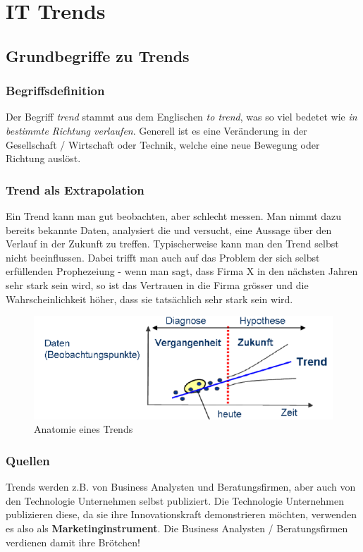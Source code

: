 \chapter{IT Trends}
\section{Grundbegriffe zu Trends}
\subsection{Begriffsdefinition}
Der Begriff \textit{trend} stammt aus dem Englischen \textit{to trend}, was so viel bedetet wie \textit{in bestimmte  Richtung verlaufen}. Generell ist es eine Veränderung in der Gesellschaft / Wirtschaft oder Technik, welche eine neue Bewegung oder Richtung auslöst.
\subsection{Trend als Extrapolation}
Ein Trend kann man gut beobachten, aber schlecht messen. Man nimmt dazu bereits bekannte Daten, analysiert die und versucht, eine Aussage über den Verlauf in der Zukunft zu treffen. Typischerweise kann man den Trend selbst nicht beeinflussen. Dabei trifft man auch auf das Problem der sich selbst erfüllenden Prophezeiung - wenn man sagt, dass Firma X in den nächsten Jahren sehr stark sein wird, so ist das Vertrauen in die Firma grösser und die Wahrscheinlichkeit höher, dass sie tatsächlich sehr stark sein wird.
\begin{figure}
\centering
\includegraphics[width=0.7\linewidth]{fig/trend}
\caption{Anatomie eines Trends}
\label{fig:trend}
\end{figure}
\subsection{Quellen}
Trends werden z.B. von Business Analysten und Beratungsfirmen, aber auch von den Technologie Unternehmen selbst publiziert. Die Technologie Unternehmen publizieren diese, da sie ihre Innovationskraft demonstrieren möchten, verwenden es also als \textbf{Marketinginstrument}. Die Business Analysten  / Beratungsfirmen verdienen damit ihre Brötchen!

